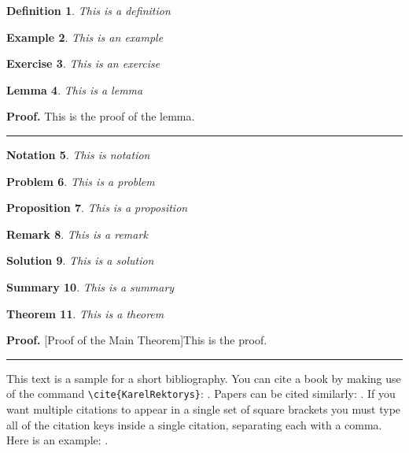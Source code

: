 \documentclass{article}%
\newtheorem{theorem}{Theorem}
\newtheorem{definition}[theorem]{Definition}
\newtheorem{example}[theorem]{Example}
\newtheorem{exercise}[theorem]{Exercise}
\newtheorem{lemma}[theorem]{Lemma}
\newtheorem{notation}[theorem]{Notation}
\newtheorem{problem}[theorem]{Problem}
\newtheorem{proposition}[theorem]{Proposition}
\newtheorem{remark}[theorem]{Remark}
\newtheorem{solution}[theorem]{Solution}
\newtheorem{summary}[theorem]{Summary}
\newenvironment{proof}[1][Proof]{\textbf{#1.} }{\ \rule{0.5em}{0.5em}}
\begin{document}
\begin{definition}
This is a definition
\end{definition}

\begin{example}
This is an example
\end{example}

\begin{exercise}
This is an exercise
\end{exercise}

\begin{lemma}
This is a lemma
\end{lemma}

\begin{proof}
This is the proof of the lemma.
\end{proof}

\begin{notation}
This is notation
\end{notation}

\begin{problem}
This is a problem
\end{problem}

\begin{proposition}
This is a proposition
\end{proposition}

\begin{remark}
This is a remark
\end{remark}

\begin{solution}
This is a solution
\end{solution}

\begin{summary}
This is a summary
\end{summary}

\begin{theorem}
This is a theorem
\end{theorem}

\begin{proof}
[Proof of the Main Theorem]This is the proof.
\end{proof}
\medskip

This text is a sample for a short bibliography. You can cite a book by making use of
the command \verb"\cite{KarelRektorys}": \cite{KarelRektorys}. Papers can be cited
similarly: \cite{Bertoti97}. If you want multiple citations to appear in a single set
of square brackets you must type all of the citation keys inside a single citation,
separating each with a comma. Here is an example: \cite{Bertoti97, Szeidl2001,
Carlson67}.
\end{document}
